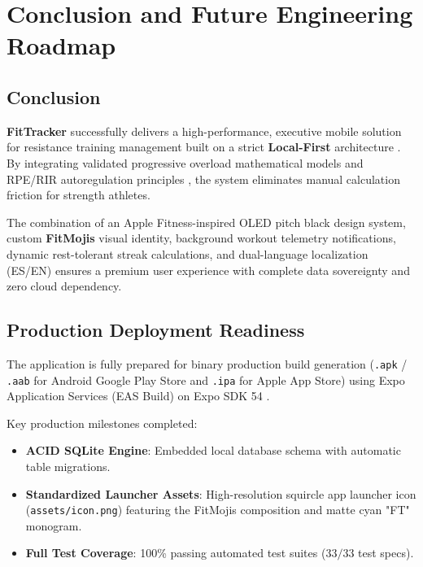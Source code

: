 \section{Conclusion and Future Engineering Roadmap}

\subsection{Conclusion}
\textbf{FitTracker} successfully delivers a high-performance, executive mobile solution for resistance training management built on a strict \textbf{Local-First} architecture \cite{kleppmann2019localfirst}. By integrating validated progressive overload mathematical models \cite{epley1985poundage, brzycki1993strength} and RPE/RIR autoregulation principles \cite{zourdos2016rpe, helms2016rpe}, the system eliminates manual calculation friction for strength athletes.

The combination of an Apple Fitness-inspired OLED pitch black design system, custom \textbf{FitMojis} visual identity, background workout telemetry notifications, dynamic rest-tolerant streak calculations, and dual-language localization (ES/EN) ensures a premium user experience with complete data sovereignty and zero cloud dependency.

\subsection{Production Deployment Readiness}
The application is fully prepared for binary production build generation (\texttt{.apk} / \texttt{.aab} for Android Google Play Store and \texttt{.ipa} for Apple App Store) using Expo Application Services (EAS Build) on Expo SDK 54 \cite{expo2024sdk}.

Key production milestones completed:
\begin{itemize}
    \item \textbf{ACID SQLite Engine}: Embedded local database schema with automatic table migrations.
    \item \textbf{Standardized Launcher Assets}: High-resolution squircle app launcher icon (\texttt{assets/icon.png}) featuring the FitMojis composition and matte cyan "FT" monogram.
    \item \textbf{Full Test Coverage}: 100\% passing automated test suites ($33/33$ test specs).
\end{itemize}

